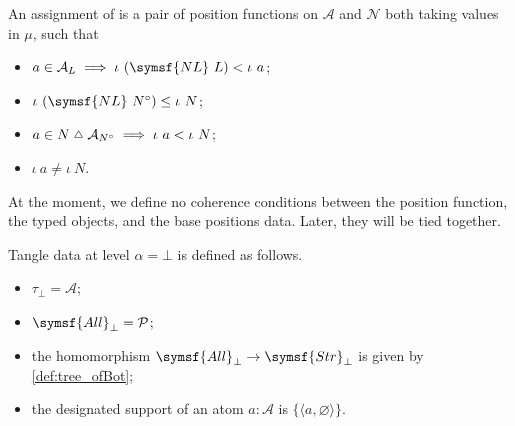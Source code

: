 \begin{definition}
    \label{def:BasePositions}
    An assignment of  is a pair of position functions on \( \mathcal A \) and \( \mathcal N \) both taking values in \( \mu \), such that
    \begin{itemize}
        \item \( a \in \mathcal A_L \implies \iota\ (\symsf{NL}\ L) < \iota\ a \);
        \item \( \iota\ (\symsf{NL}\ N^\circ) \leq \iota\ N \);
        \item \( a \in N \symmdiff \mathcal A_{N^\circ} \implies \iota\ a < \iota\ N \);
        \item \( \iota\ a \neq \iota\ N \).
    \end{itemize}
\end{definition}
\begin{remark}
    At the moment, we define no coherence conditions between the position function, the typed objects, and the base positions data.
    Later, they will be tied together.
\end{remark}
\begin{definition}
    Tangle data at level \( \alpha = \bot \) is defined as follows.
    \begin{itemize}
        \item \( \tau_\bot = \mathcal A \);
        \item \( \symsf{All}_\bot = \mathcal P \);
        \item the homomorphism \( \symsf{All}_\bot \to \symsf{Str}_\bot \) is given by \cref{def:tree_ofBot};
        \item the designated support of an atom \( a : \mathcal A \) is \( \{\langle a, \varnothing \rangle\} \).
    \end{itemize}
\end{definition}
